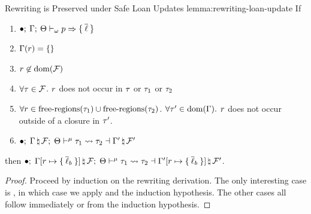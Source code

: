 \begin{oxlemma}{Rewriting is Preserved under Safe Loan Updates}
  {lemma:rewriting-loan-update} If
  \begin{enumerate}
  \item $\bullet; \: \Gamma; \: \Theta \vdash_{\omega} p \Rightarrow 
    \{ \: \overline{\ell} \: \} $
  \item $\Gamma(r) = \{\}$
  \item $r \not \in \textrm{dom}(\mathcal{F})$
  \item $\forall \tau \in \mathcal{F}$. $r$ does not occur in $\tau$ or $\tau_1$ or $\tau_2$
  \item $\forall r \in \textrm{free-regions}(\tau_1) \cup \textrm{free-regions}(\tau_2)$.
    $\forall \tau^\prime \in \textrm{dom}(\Gamma).$ $r$ does not occur
    outside of a closure in $\tau^\prime$.
  \item $\bullet; \; 
    \Gamma \, \natural \, \mathcal{F}
  ; \; \Theta \vdash^{\mu} \tau_1 \leadsto \tau_2 \dashv 
    \Gamma^\prime \, \natural \, \mathcal{F}^\prime
 $
  \end{enumerate}
  then
  $\bullet; \; 
    \Gamma[r \mapsto \{ \: \overline{\ell}_b \: \}] \, \natural \, \mathcal{F}
  ; \; \Theta \vdash^{\mu} \tau_1 \leadsto \tau_2 \dashv 
    \Gamma^{\prime}[r \mapsto \{ \: \overline{\ell}_b \: \}] \, \natural \, \mathcal{F}^{\prime}
 $.

\end{oxlemma}
\begin{proof}
  Proceed by induction on the rewriting derivation. The only interesting case is
  , in which case we apply
   and the induction hypothesis. The other
  cases all follow immediately or from the induction hypothesis.
\end{proof}

